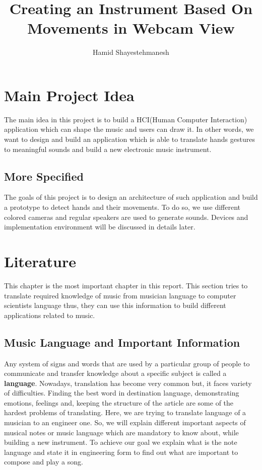 \documentclass{report}
\begin{document}
\author{Hamid Shayestehmanesh}
\title{Creating an Instrument Based On Movements in Webcam View}
\maketitle
\tableofcontents
\newpage

\chapter{Main Project Idea}
The main idea in this project is to build a HCI(Human Computer Interaction) application which can shape the music and users can draw it. In other words, we want to design and build an application which is able to translate hands gestures to meaningful sounds and build a new electronic music instrument.

\section{More Specified}
The goals of this project is to design an architecture of such application and build a prototype to detect hands and their movements. To do so, we use different colored cameras and regular speakers are used to generate sounds. Devices and implementation environment will be discussed in details later.
\pagebreak


\chapter{Literature}
This chapter is the most important chapter in this report. This section tries to translate required knowledge of music from musician language to computer scientists language thus, they can use this information to build different applications related to music.
\section{Music Language and Important Information}
Any system of signs and words that are used by a particular group of people to communicate and transfer knowledge about a specific subject is called a \textbf{language}. Nowadays, translation has become very common but, it faces variety of difficulties. Finding the best word in destination language, demonstrating emotions, feelings and, keeping the structure of the article are some of the hardest problems of translating. Here, we are trying to translate language of a musician to an engineer one. So, we will explain different important aspects of musical notes or music language which are mandatory to know about, while building a new instrument. To achieve our goal we explain what is the note language and state it in engineering form to find out what are important to compose and play a song. 
\end{document}
